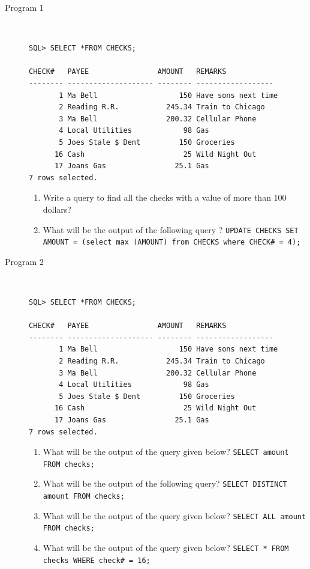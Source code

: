 \documentclass[11pt,a4paper]{article}
\def\AnswerBox{\fbox{\begin{minipage}{4in}\hfill\vspace{0.5in}\end{minipage}}}
\begin{document}
\begin{description}
\item[Program 1]\
\begin{verbatim}
SQL> SELECT *FROM CHECKS;

CHECK#   PAYEE                AMOUNT   REMARKS
-------- -------------------- -------- ------------------
       1 Ma Bell                   150 Have sons next time
       2 Reading R.R.           245.34 Train to Chicago
       3 Ma Bell                200.32 Cellular Phone
       4 Local Utilities            98 Gas
       5 Joes Stale $ Dent         150 Groceries
      16 Cash                       25 Wild Night Out
      17 Joans Gas                25.1 Gas
7 rows selected.
\end{verbatim}


\begin{enumerate}[label=\bfseries Q\arabic*:]\itemsep10pt
\item Write a query to find all the checks with a value of more than 100 dollars?
\item What will be the output of the following query ?\newline
\texttt{UPDATE CHECKS SET AMOUNT = (select max (AMOUNT) from CHECKS where CHECK\# = 4);}
\end{enumerate}

\item [Program 2]\ 
\begin{verbatim}
SQL> SELECT *FROM CHECKS;

CHECK#   PAYEE                AMOUNT   REMARKS
-------- -------------------- -------- ------------------
       1 Ma Bell                   150 Have sons next time
       2 Reading R.R.           245.34 Train to Chicago
       3 Ma Bell                200.32 Cellular Phone
       4 Local Utilities            98 Gas
       5 Joes Stale $ Dent         150 Groceries
      16 Cash                       25 Wild Night Out
      17 Joans Gas                25.1 Gas
7 rows selected.
\end{verbatim}

\begin{enumerate}[label=\bfseries Q\arabic*:]\itemsep10pt
\item What will be the output of the query given below?\newline
\texttt{SELECT amount  FROM checks;}
\item What will be the output of the following query?\newline
\texttt{SELECT DISTINCT amount FROM checks;}
\item What will be the output of the query given below?\newline
\texttt{SELECT ALL amount FROM checks;}
\item What will be the output  of the query given below?\newline
\texttt{SELECT * FROM checks WHERE check\# = 16;}
\end{enumerate}


\end{description}
\end{document}
